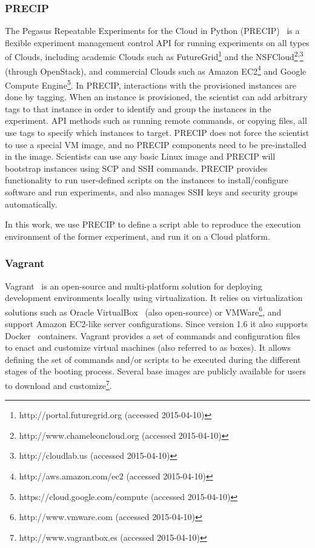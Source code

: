 \subsubsection{PRECIP}
The Pegasus Repeatable Experiments for the Cloud in Python (PRECIP)~\cite{Azarnoosh-CRC-2013} 
is a flexible experiment management control API for running experiments on all types of Clouds, 
including academic Clouds such as FutureGrid\footnote{http://portal.futuregrid.org (accessed 2015-04-10)} and the NSFCloud\footnote{http://www.chameleoncloud.org (accessed 2015-04-10)}\textsuperscript{,}\footnote{http://cloudlab.us (accessed 2015-04-10)}
(through OpenStack), and commercial Clouds such as Amazon EC2\footnote{http://aws.amazon.com/ec2 (accessed 2015-04-10)} and Google Compute Engine\footnote{https://cloud.google.com/compute (accessed 2015-04-10)}. In PRECIP, interactions with the provisioned instances are done by 
tagging. When an instance is provisioned, the scientist can add arbitrary tags to that instance in 
order to identify and group the instances in the experiment. API methods such as running remote 
commands, or copying files, all use tags to specify which instances to target. PRECIP does not 
force the scientist to use a special VM image, and no PRECIP components need to be pre-installed 
in the image. Scientists can use any basic Linux image and PRECIP will bootstrap instances using 
SCP and SSH commands. PRECIP provides functionality to run user-defined scripts on the instances 
to install/configure software and run experiments, and also manages SSH keys and security groups 
automatically.

In this work, we use PRECIP to define a script able to reproduce the execution environment of the 
former experiment, and run it on a Cloud platform.


\subsubsection{Vagrant}

Vagrant~\cite{palat2012introducing} is an open-source and multi-platform solution for deploying 
development environments locally using virtualization. It relies on virtualization solutions such as 
Oracle VirtualBox~\cite{Watson2008} (also open-source) or  VMWare\footnote{http://www.vmware.com (accessed 2015-04-10)}, and support 
Amazon EC2-like server configurations. Since version 1.6 it also supports Docker~\cite{Merkel2014} 
containers.
Vagrant provides a set of commands and configuration files to enact and customize virtual machines
(also referred to as boxes). It allows defining the set of commands and/or scripts to be executed during 
the different stages of the booting process. Several base images are publicly available for users to 
download and customize\footnote{http://www.vagrantbox.es (accessed 2015-04-10)}. 
 

